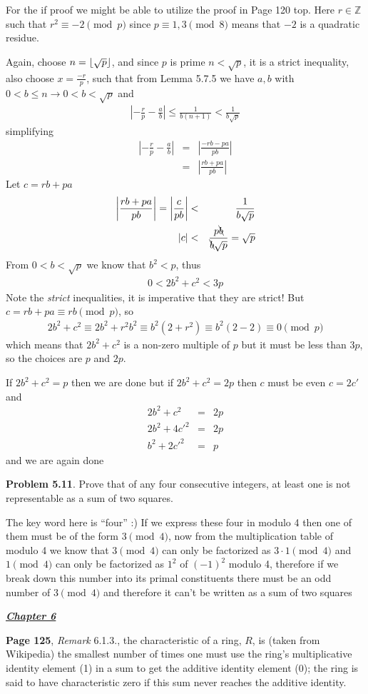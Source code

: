 \documentclass[aps,preprint,preprintnumbers,nofootinbib,showpacs,prd]{revtex4-1}
\newcommand{\nbea}{\begin{eqnarray*}}
\newcommand{\neea}{\end{eqnarray*}}
\DeclarePairedDelimiter{\floor}{\lfloor}{\rfloor}
\begin{document}
For the if proof we might be able to utilize the proof in Page 120 top. Here $r \in \mathbb{Z}$ such that $r^2 \equiv -2 \pmod{p}$ since $p \equiv 1,3 \pmod{8}$ means that $-2$ is a quadratic residue.

Again, choose $n = \floor{\sqrt{p}}$, and since $p$ is prime $n < \sqrt{p}$, it is a strict inequality, also choose $x = \frac{-r}{p}$, such that from Lemma 5.7.5 we have $a,b$ with $0 <b \le n \to 0 < b < \sqrt{p}$ and
%
\nbea
\left | -\frac{r}{p} - \frac{a}{b} \right | \le \frac{1}{b(n+1)} < \frac{1}{b\sqrt{p}}
\neea
%
simplifying
%
\nbea
\left | -\frac{r}{p} - \frac{a}{b} \right | & = & \left | \frac{-rb - pa}{pb} \right | \\
& = & \left | \frac{rb + pa}{pb} \right |
\neea
%
Let $c = rb + pa$
%
\nbea
\left | \frac{rb + pa}{pb} \right | = \left | \frac{c}{pb} \right | & < & \frac{1}{b\sqrt{p}} \\
|c| & < & \frac{p\bcancel{b}}{\bcancel{b}\sqrt{p}} = \sqrt{p}
\neea
%
From $0 < b < \sqrt{p}$ we know that $b^2 < p$, thus
%
\nbea
0 < 2b^2 + c^2 < 3p
\neea
%
Note the {\it strict} inequalities, it is imperative that they are strict! But $c = rb + pa \equiv rb \pmod{p}$, so
%
\nbea
2b^2 + c^2 \equiv 2b^2 + r^2b^2 \equiv b^2(2 + r^2) \equiv b^2 (2 - 2) \equiv 0 \pmod{p}
\neea
%
which means that $2b^2 + c^2$ is a non-zero multiple of $p$ but it must be less than $3p$, so the choices are $p$ and $2p$.

If $2b^2 + c^2 = p$ then we are done but if $2b^2 + c^2 = 2p$ then $c$ must be even $c = 2c'$ and
%
\nbea
2b^2 + c^2 & = & 2p \\
2b^2 + 4c'^2 & = & 2p \\
b^2 + 2c'^2 & = & p
\neea
%
and we are again done

{\bf Problem 5.11}. Prove that of any four consecutive integers, at least one is not representable as a sum of two squares.

The key word here is ``four'' :) If we express these four in modulo 4 then one of them must be of the form $3 \pmod{4}$, now from the multiplication table of modulo 4 we know that $3 \pmod{4}$ can only be factorized as $3 \cdot 1 \pmod{4}$ and $1 \pmod{4}$ can only be factorized as $1^2$ of $(-1)^2$ modulo 4, therefore if we break down this number into its primal constituents there must be an odd number of $3 \pmod{4}$ and therefore it can't be written as a sum of two squares

\bigskip
\underline{\textbf{\textit{Chapter 6}}}
\bigskip

{\bf Page 125}, {\it Remark } 6.1.3., the characteristic of a ring, $R$, is (taken from Wikipedia) the smallest number of times one must use the ring's multiplicative identity element (1) in a sum to get the additive identity element (0); the ring is said to have characteristic zero if this sum never reaches the additive identity.
\end{document}
